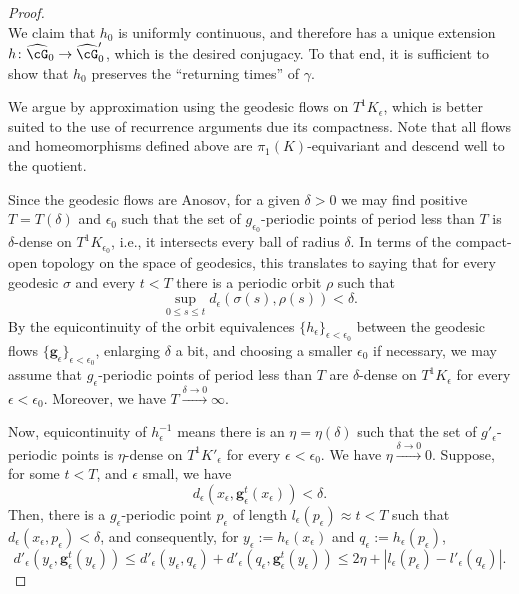 \documentclass[reqno,11pt]{amsart}
\begin{document}
\begin{proof}
\[\]
We claim that \(h_0\) is uniformly continuous, and therefore has a unique extension \(h\colon \widehat{\cG}_0 \to \widehat{\cG}_0'\), which is the desired conjugacy.
To that end, it is sufficient to show that \(h_0\) preserves the ``returning times'' of \(\gamma\).
\par We argue by approximation using the geodesic flows on \(T^1K_\epsilon\), which is better suited to the use of recurrence arguments due its compactness.
Note that all flows and homeomorphisms defined above are \(\pi_1(K)\)-equivariant and descend well to the quotient.
\par Since the geodesic flows are Anosov, for a given \(\delta>0\) we may find positive \(T = T(\delta)\) and \(\epsilon_0\) such that the set of \(g_{\epsilon_0}\)-periodic points of period less than \(T\) is \(\delta\)-dense on \(T^1K_{\epsilon_0}\), i.e., it intersects every ball of radius \(\delta\).
In terms of the compact-open topology on the space of geodesics, this translates to saying that for every geodesic \(\sigma\) and every \(t < T\) there is a periodic orbit \(\rho\) such that
\[
   \sup_{0 \leq s \leq t} d_\epsilon(\sigma(s), \rho(s)) < \delta.
\]
By the equicontinuity of the orbit equivalences $\{h_\epsilon\}_{\epsilon < \epsilon_0}$ between the geodesic flows $\{\mathbf{g}_\epsilon\}_{\epsilon < \epsilon_0}$, enlarging \(\delta\) a bit, and choosing a smaller \(\epsilon_0\) if necessary, we may assume that \(g_{\epsilon}\)-periodic points of period less than \(T\) are \(\delta\)-dense on \(T^1K_{\epsilon}\) for every \(\epsilon < \epsilon_0\).
Moreover, we have \(T \xrightarrow{\delta\to 0} \infty\).
\par Now, equicontinuity of \(h_\epsilon^{-1}\) means there is an \(\eta = \eta(\delta)\) such that the set of \(g'_\epsilon\)-periodic points is \(\eta\)-dense on \(T^1K'_{\epsilon}\) for every \(\epsilon < \epsilon_0\).
We have \(\eta \xrightarrow{\delta \to 0} 0\).
Suppose, for some \(t < T\), and \(\epsilon\) small, we have 
\begin{equation}\label{eq:returning_times}
    d_\epsilon(x_\epsilon, \mathbf{g}^t_\epsilon(x_\epsilon)) < \delta. 
\end{equation}
Then, there is a \(g_\epsilon\)-periodic point \(p_\epsilon\) of length \(l_\epsilon(p_\epsilon) \approx t < T\) such that \(d_\epsilon(x_\epsilon, p_\epsilon) < \delta\), and consequently, for \(y_\epsilon := h_\epsilon(x_\epsilon)\) and \(q_\epsilon := h_\epsilon(p_\epsilon)\),
\[
    d'_\epsilon(y_\epsilon, \mathbf{g}^t_\epsilon(y_\epsilon)) \leq d'_\epsilon(y_\epsilon, q_\epsilon) + d'_\epsilon(q_\epsilon, \mathbf{g}^t_\epsilon(y_\epsilon)) \leq 2\eta + |l_\epsilon(p_\epsilon) - l'_\epsilon(q_\epsilon)|.
\]
\end{proof}
\end{document}
